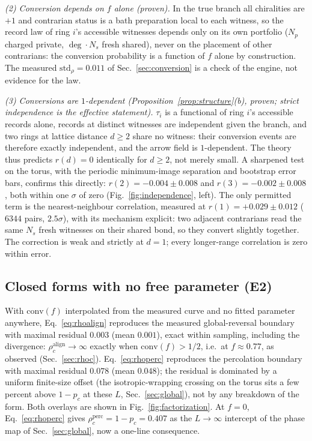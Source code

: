 \documentclass[11pt]{article}
\newcommand{\conv}{\mathrm{conv}}
\newcommand{\rhoalign}{\rho_c^{\mathrm{align}}}
\newcommand{\rhoperc}{\rho_c^{\mathrm{perc}}}
\begin{document}
\emph{(2) Conversion depends on $f$ alone (proven).} In the true branch all
chiralities are $+1$ and contrarian status is a bath preparation local to
each witness, so the record law of ring $i$'s accessible witnesses depends
only on its own portfolio ($N_p$ charged private, $\deg \cdot N_s$ fresh
shared), never on the placement of other contrarians: the conversion
probability is a function of $f$ alone by construction. The measured
$\mathrm{std}_\rho = 0.011$ of Sec.~\ref{sec:conversion} is a check of the
engine, not evidence for the law.

\emph{(3) Conversions are $1$-dependent
(Proposition~\ref{prop:structure}(b), proven; strict independence is the
effective statement).} $\tau_i$ is a functional of ring $i$'s accessible records
alone, records at distinct witnesses are independent given the branch, and
two rings at lattice distance $d \ge 2$ share no witness: their conversion
events are therefore exactly independent, and the arrow field is
$1$-dependent. The theory thus predicts $r(d) = 0$ identically for
$d \ge 2$, not merely small. A sharpened test on the torus, with the
periodic minimum-image separation and bootstrap error bars, confirms this
directly: $r(2) = -0.004 \pm 0.008$ and $r(3) = -0.002 \pm 0.008$, both
within one $\sigma$ of zero (Fig.~\ref{fig:independence}, left). The only
permitted term is the nearest-neighbour correlation, measured at
$r(1) = +0.029 \pm 0.012$ ($6344$ pairs, $2.5\sigma$), with its mechanism
explicit: two adjacent contrarians read the same $N_s$ fresh witnesses on
their shared bond, so they convert slightly together. The correction is weak
and strictly at $d=1$; every longer-range correlation is zero within error.

\subsection{Closed forms with no free parameter (E2)}

With $\conv(f)$ interpolated from the measured curve and no fitted parameter
anywhere, Eq.~\eqref{eq:rhoalign} reproduces the measured global-reversal
boundary with maximal residual $0.003$ (mean $0.001$), exact within
sampling, including the divergence: $\rhoalign \to \infty$ exactly when
$\conv(f) > 1/2$, i.e.\ at $f \approx 0.77$, as observed
(Sec.~\ref{sec:rhoc}). Eq.~\eqref{eq:rhoperc} reproduces the percolation
boundary with maximal residual $0.078$ (mean $0.048$); the residual is
dominated by a uniform finite-size offset (the isotropic-wrapping crossing
on the torus sits a few percent above $1-p_c$ at these $L$, Sec.~\ref{sec:global}),
not by any breakdown of the form. Both overlays are shown in
Fig.~\ref{fig:factorization}. At $f = 0$, Eq.~\eqref{eq:rhoperc} gives
$\rhoperc = 1 - p_c = 0.407$ as the $L\to\infty$ intercept of the phase map
of Sec.~\ref{sec:global}, now a one-line consequence.
\end{document}
